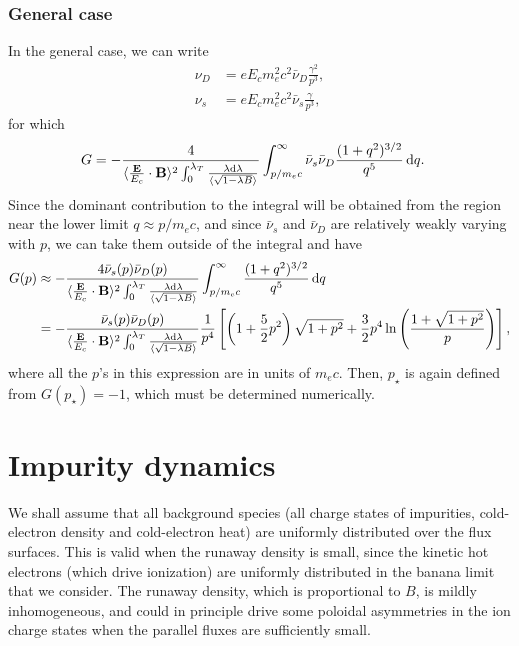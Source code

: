 \documentclass[11pt,a4paper]{article}
\newcommand{\rd}{\ensuremath{\mathrm{d}}}
\renewcommand{\b}[1]{\ensuremath{ {\bf #1 } }}
\begin{document}
\subsubsection*{General case}
In the general case, we can write
\begin{align}
\nu_D &= eE_c m_e^2 c^2 \bar\nu_D \frac{ \gamma^2}{p^3}, \nonumber \\
\nu_s &= eE_c m_e^2 c^2 \bar\nu_s \frac{ \gamma}{p^3},
\end{align}
for which
\begin{align}
G &=  -\frac{ 4}{ \langle \frac{\b{E}}{E_c}\cdot\b{B}\rangle^2 \int_0^{\lambda_T} \frac{\lambda\rd\lambda}{\langle\sqrt{1-\lambda B}\rangle}}  \int_{p/m_e c}^\infty \bar\nu_s\bar\nu_D\frac{(1+q^2)^{3/2}}{q^5} \,\rd q.
\end{align}
Since the dominant contribution to the integral will be obtained from the region near the lower limit $q \approx p/m_e c$, and since $\bar\nu_s$ and $\bar\nu_D$ are relatively weakly varying with $p$, we can take them outside of the integral and have
\begin{align}
G(p) &\approx -\frac{ 4 \bar\nu_s(p)\bar\nu_D(p)}{ \langle \frac{\b{E}}{E_c}\cdot\b{B}\rangle^2 \int_0^{\lambda_T} \frac{\lambda\rd\lambda}{\langle\sqrt{1-\lambda B}\rangle}} \int_{p/m_e c}^\infty \frac{(1+q^2)^{3/2}}{q^5} \,\rd q \nonumber \\
&= -\frac{  \bar\nu_s(p)\bar\nu_D(p)}{ \langle \frac{\b{E}}{E_c}\cdot\b{B}\rangle^2 \int_0^{\lambda_T} \frac{\lambda\rd\lambda}{\langle\sqrt{1-\lambda B}\rangle}}\frac{1}{p^4}\left[\left(1+\frac{5}{2}p^2\right)\sqrt{1+p^2} + \frac{3}{2}p^4\ln\left(\frac{1+\sqrt{1+p^2}}{p}\right)\right],
\end{align}
where all the $p$'s in this expression are in units of $m_e c$. Then, $p_\star$ is again defined from $G(p_\star)=-1$, which must be determined numerically.



\section{Impurity dynamics}
We shall assume that all background species (all charge states of impurities, cold-electron density and cold-electron heat) are uniformly distributed over the flux surfaces. This is valid when the runaway density is small, since the kinetic hot electrons (which drive ionization) are uniformly distributed in the banana limit that we consider. The runaway density, which is proportional to $B$, is mildly inhomogeneous, and could in principle drive some poloidal asymmetries in the ion charge states when the parallel fluxes are sufficiently small. 
\end{document}
